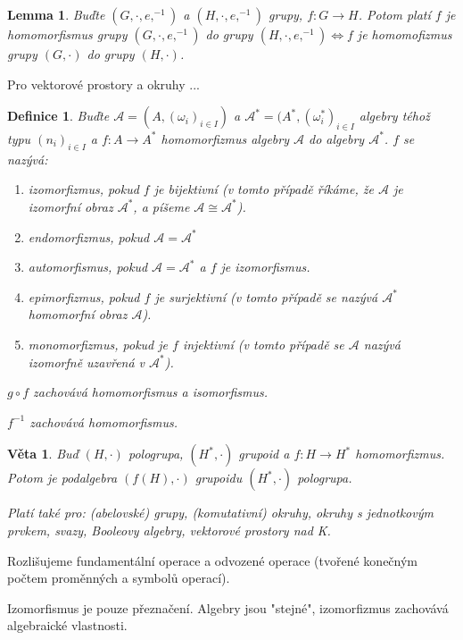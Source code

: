 \documentclass[a4paper, 11pt]{report}
\newtheorem{mydef}{Definice}[chapter]
\newtheorem{veta}{Věta}
\newtheorem{lemma}{Lemma}
\begin{document}
\begin{lemma}
Buďte $(G, \cdot, e, ^{-1})$ a $(H, \cdot, e, ^{-1})$ grupy, $f: G \to H$. Potom platí $f$ je homomorfismus grupy $(G, \cdot, e, ^{-1})$ do grupy $(H, \cdot, e, ^{-1}) \Leftrightarrow f$ je homomofizmus grupy $(G, \cdot)$ do grupy $(H, \cdot)$.
\end{lemma}

Pro vektorové prostory a okruhy ...

\begin{mydef}
Buďte $\mathcal{A} = (A, (\omega_i)_{i \in I})$ a $\mathcal{A}^* = (A^*, (\omega^*_i)_{i \in I}$ algebry téhož typu $(n_i)_{i \in I}$ a $f: A \to A^*$ homomorfizmus algebry $\mathcal{A}$ do algebry $\mathcal{A}^*$. $f$ se nazývá:
\begin{enumerate}
	\item \emph{izomorfizmus}, pokud $f$ je bijektivní (v tomto případě říkáme, že $\mathcal{A}$ je izomorfní obraz $\mathcal{A}^*$, a píšeme $\mathcal{A} \cong \mathcal{A}^*$).
	\item \emph{endomorfizmus}, pokud $\mathcal{A} = \mathcal{A}^*$
	\item \emph{automorfismus}, pokud $\mathcal{A} = \mathcal{A}^*$ a $f$ je izomorfismus.
	\item \emph{epimorfizmus}, pokud $f$ je surjektivní (v tomto případě se nazývá $\mathcal{A}^*$ homomorfní obraz $\mathcal{A}$).
	\item \emph{monomorfizmus}, pokud je $f$ injektivní (v tomto případě se $\mathcal{A}$ nazývá izomorfně uzavřená v $\mathcal{A}^*$).
\end{enumerate}

$g \circ f$ zachovává homomorfismus a isomorfismus.

$f^{-1}$ zachovává homomorfismus.
\end{mydef}

\begin{veta}
Buď $(H, \cdot)$ pologrupa, $(H^*, \cdot)$ grupoid a $f: H \to H^*$ homomorfizmus. Potom je podalgebra $(f(H), \cdot)$ grupoidu $(H^*, \cdot)$ pologrupa.

Platí také pro: (abelovské) grupy, (komutativní) okruhy, okruhy s jednotkovým prvkem, svazy, Booleovy algebry, vektorové prostory nad K.
\end{veta}

Rozlišujeme fundamentální operace a odvozené operace (tvořené konečným počtem proměnných a symbolů operací).

Izomorfismus je pouze přeznačení. Algebry jsou "stejné", izomorfizmus zachovává algebraické vlastnosti.
\end{document}
